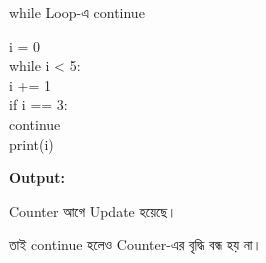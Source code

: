 \begin{codeoutputbox}{\textenglish{\ttfamily while} Loop-এ \textenglish{\ttfamily continue}}

\noindent
\begin{minipage}[t]{0.54\linewidth}
\codeheading

\begin{english}
\ttfamily
i = 0\\
while i < 5:\\
\hspace*{4mm}i += 1\\
\hspace*{4mm}if i == 3:\\
\hspace*{8mm}continue\\
\hspace*{4mm}print(i)
\end{english}

\end{minipage}
\hfill
\begin{minipage}[t]{0.42\linewidth}
\outputheading

\textbf{Output:}

\begin{center}
\textenglish{   }
\end{center}

Counter আগে Update হয়েছে।

তাই
\textenglish{\ttfamily continue}
হলেও Counter-এর বৃদ্ধি বন্ধ হয় না।

\end{minipage}

\end{codeoutputbox}



